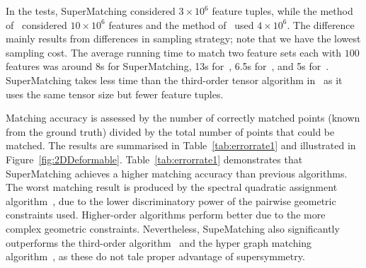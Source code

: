 In the tests, SuperMatching considered $3\times 10^6$ feature tuples, while the method of~\cite{Duchenne09} considered $10\times 10^6$ features  and the method of~\cite{Zass08} used $4\times 10^6$.
The difference  mainly results from differences in sampling strategy; note that we have the lowest  sampling cost.
The average running time to match two feature sets each with $100$ features was around 8s for SuperMatching, 13s for~\cite{Duchenne09}, 6.5s for~\cite{Zass08}, and 5s for~\cite{Cour06}.
SuperMatching takes less  time than the third-order tensor algorithm in~\cite{Duchenne09} as it uses the same tensor size but fewer feature tuples.

Matching accuracy is assessed by the number of correctly matched points (known from the  ground truth) divided by the total number of points that could be matched.
The results are summarised in Table~\ref{tab:errorrate1} and illustrated in Figure~\ref{fig:2DDeformable}.
Table~\ref{tab:errorrate1} demonstrates that SuperMatching achieves a higher matching accuracy than previous algorithms.
The worst matching result is produced by the spectral quadratic assignment algorithm~\cite{Cour06},
due to the lower discriminatory power of the pairwise geometric constraints used.
Higher-order algorithms perform  better due to the more complex geometric constraints.
Nevertheless, SupeMatching also significantly outperforms the third-order algorithm~\cite{Duchenne09} and the hyper graph matching algorithm~\cite{Zass08}, as these do not tale proper advantage of supersymmetry.



